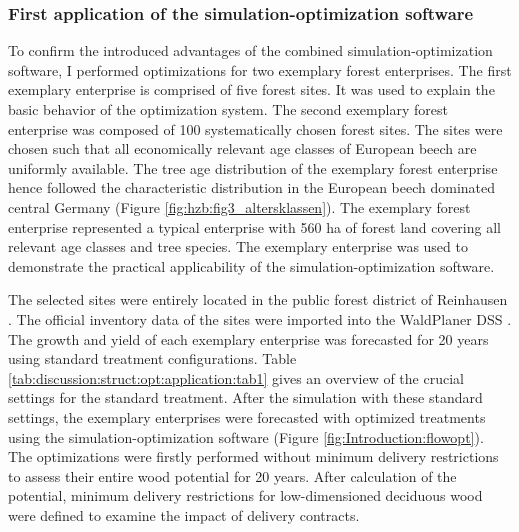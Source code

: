 \subsubsection{First application of the simulation-optimization software}
\label{subsubsec:discussion:struct:opt:application}
To confirm the introduced advantages of the combined simulation-optimization software, I performed optimizations for two exemplary forest enterprises. The first exemplary enterprise is comprised of five forest sites. It was used to explain the basic behavior of the optimization system. The second exemplary forest enterprise was composed of 100 systematically chosen forest sites. The sites were chosen such that all economically relevant age classes of European beech are uniformly available. The tree age distribution of the exemplary forest enterprise hence followed the characteristic distribution in the European beech dominated central Germany (Figure \ref{fig:hzb:fig3_altersklassen}). The exemplary forest enterprise represented a typical enterprise with 560 ha of forest land covering all relevant age classes and tree species. The exemplary enterprise was used to demonstrate the practical applicability of the simulation-optimization software. 

The selected sites were entirely located in the public forest district of Reinhausen \citep{nlf_2017}. The official inventory data of the sites were imported into the WaldPlaner DSS \citep{hansen_2014}. The growth and yield of each exemplary enterprise was forecasted for 20 years using standard treatment configurations. Table \ref{tab:discussion:struct:opt:application:tab1} gives an overview of the crucial settings for the standard treatment. After the simulation with these standard settings, the exemplary enterprises were forecasted with optimized treatments using the simulation-optimization software (Figure \ref{fig:Introduction:flowopt}). The optimizations were firstly performed without minimum delivery restrictions to assess their entire wood potential for 20 years. After calculation of the potential, minimum delivery restrictions for low-dimensioned deciduous wood were defined to examine the impact of delivery contracts.

